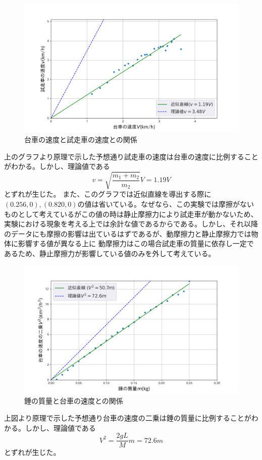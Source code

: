 \documentclass{jlreq}
\begin{document}
  \begin{figure}[H]
    \centering
    \includegraphics[scale=0.65]{Figure_2.png}
    \caption{台車の速度と試走車の速度との関係}
    \label{fig:2ji}
  \end{figure}%
  上のグラフより原理で示した予想通り試走車の速度は台車の速度に比例することがわかる。しかし、理論値である\[v=\sqrt{\frac{m_1+m_2}{m_2}}V=1.19V\]とずれが生じた。
  また、このグラフでは近似直線を導出する際に$(0.256,0),(0.820,0)$の値は省いている。なぜなら、この実験では摩擦がないものとして考えているがこの値の時は静止摩擦力により試走車が動かないため、
  実験における現象を考える上では余計な値であるからである。しかし、それ以降のデータにも摩擦の影響は出ているはずであるが、動摩擦力と静止摩擦力では物体に影響する値が異なる上に
  動摩擦力はこの場合試走車の質量に依存し一定であるため、静止摩擦力が影響している値のみを外して考えている。

  \begin{figure}[H]
    \centering
    \includegraphics[scale=0.65]{Figure_3.png}
    \caption{錘の質量と台車の速度との関係}
    \label{fig:3ji}
  \end{figure}%
  上図より原理で示した予想通り台車の速度の二乗は錘の質量に比例することがわかる。しかし、理論値である\[V^2=\frac{2gL}{M}m=72.6m\]とずれが生じた。
\end{document}

